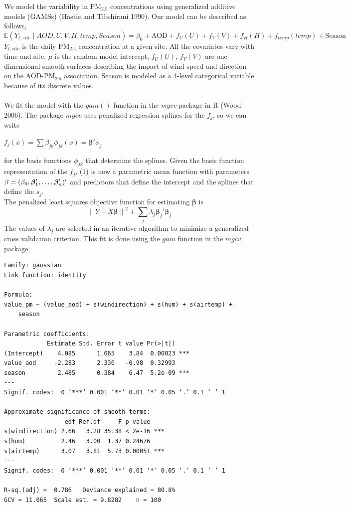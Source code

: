 \documentclass[10pt]{article}
\def\PM{{\mathrm{PM_{2.5}}}}
\begin{document}
We model the variability in $\PM$ concentrations using generalized additive models (GAMSs) (Hastie and Tibshirani 1990). Our model can be described as follows, 
\begin{equation} 
{\mathbb{E}}(Y_{t,site} \mid AOD, U, V, H, temp, Season) = \beta_0 + \text{AOD} + f_{U}(U) + f_{V}(V) + f_{H}(H) + f_{temp}(temp) + \text{Season}  
\end{equation} 
$Y_{t, \text{site}}$ is the daily $\PM$ concentration at a given site. All the covariates vary with time and site. $\mu$ is the random model intercept, $f_{U}(U)$, $f_{V}(V)$ are one dimensional smooth surfaces describing the impact of wind speed and direction on the AOD-$\PM$ association. Season is modeled as a 4-level categorical variable because of its discrete values. \\ \\
We fit the model with the $gam()$ function in the {\textit{mgcv}} package in R (Wood 2006). The package ${mgcv}$ uses penalized regression splines for the $f_{j}$, so we can write
\begin{center} 
$f_{j}(x) = \sum \beta_{jk} {\phi_{jk}}(x) = {\bm{\beta{'}}}{\phi_j}$
\end{center} 
for the basis functions ${\phi_{jk}}$ that determine the splines. Given the basis function representation of the $f_j$, (1) is now a parametric mean function with parameters 
${\bf{\beta}} = (\beta_0, {\bm{\beta}_1'}, \ldots, {\bm{\beta}_n'})'$ 
and predictors that define the intercept and the splines that define the $s_j$.  \\
The penalized least squares objective function for estimating ${\bm{\beta}}$ is 
\begin{equation} 
{\lVert Y - X{\bm{\beta}}\rVert}^{2} + \sum_{j}\lambda_{j}{\bm{\beta}_j'}{\bm{\beta}_j}
\end{equation}
The values of $\lambda_{j}$ are selected in an iterative algorithm to minimize a generalized cross validation criterion. This fit is done using the ${gam}$ function in the ${mgcv}$ package, 
\begin{verbatim}
Family: gaussian 
Link function: identity 

Formula:
value_pm ~ (value_aod) + s(windirection) + s(hum) + s(airtemp) + 
    season

Parametric coefficients:
            Estimate Std. Error t value Pr(>|t|)    
(Intercept)    4.085      1.065    3.84  0.00023 ***
value_aod     -2.283      2.330   -0.98  0.32993    
season         2.485      0.384    6.47  5.2e-09 ***
---
Signif. codes:  0 ‘***’ 0.001 ‘**’ 0.01 ‘*’ 0.05 ‘.’ 0.1 ‘ ’ 1

Approximate significance of smooth terms:
                 edf Ref.df     F p-value    
s(windirection) 2.66   3.28 35.38 < 2e-16 ***
s(hum)          2.46   3.00  1.37 0.24676    
s(airtemp)      3.07   3.81  5.73 0.00051 ***
---
Signif. codes:  0 ‘***’ 0.001 ‘**’ 0.01 ‘*’ 0.05 ‘.’ 0.1 ‘ ’ 1

R-sq.(adj) =  0.786   Deviance explained = 80.8%
GCV = 11.065  Scale est. = 9.8282    n = 100
\end{verbatim} 
\end{document}
